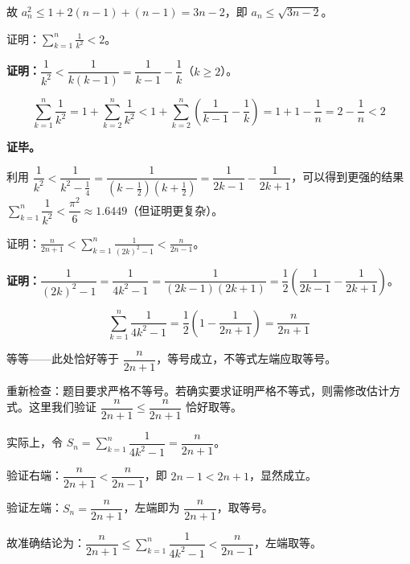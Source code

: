 \documentclass[12pt, a4paper]{ctexart}
\begin{document}
故 $a_n^2 \leq 1 + 2(n-1) + (n-1) = 3n - 2$，即 $a_n \leq \sqrt{3n-2}$。\;\checkmark

\begin{examplebox}[【例题7】裂项求和与放缩]
证明：$\displaystyle\sum_{k=1}^{n} \frac{1}{k^2} < 2$。
\end{examplebox}

\textbf{证明：}$\dfrac{1}{k^2} < \dfrac{1}{k(k-1)} = \dfrac{1}{k-1} - \dfrac{1}{k}$（$k \geq 2$）。

\[
\sum_{k=1}^{n}\frac{1}{k^2} = 1 + \sum_{k=2}^{n}\frac{1}{k^2} < 1 + \sum_{k=2}^{n}\left(\frac{1}{k-1} - \frac{1}{k}\right) = 1 + 1 - \frac{1}{n} = 2 - \frac{1}{n} < 2
\]

\textbf{证毕。}

\begin{tipbox}[更强的上界]
利用 $\dfrac{1}{k^2} < \dfrac{1}{k^2 - \frac{1}{4}} = \dfrac{1}{(k-\frac{1}{2})(k+\frac{1}{2})} = \dfrac{1}{2k-1} - \dfrac{1}{2k+1}$，可以得到更强的结果 $\displaystyle\sum_{k=1}^{n}\dfrac{1}{k^2} < \dfrac{\pi^2}{6} \approx 1.6449$（但证明更复杂）。
\end{tipbox}

\begin{examplebox}[【例题8】裂项放缩求和的精确估计]
证明：$\displaystyle\frac{n}{2n+1} < \sum_{k=1}^{n}\frac{1}{(2k)^2 - 1} < \frac{n}{2n-1}$。
\end{examplebox}

\textbf{证明：}$\dfrac{1}{(2k)^2 - 1} = \dfrac{1}{4k^2 - 1} = \dfrac{1}{(2k-1)(2k+1)} = \dfrac{1}{2}\left(\dfrac{1}{2k-1} - \dfrac{1}{2k+1}\right)$。

\[
\sum_{k=1}^{n}\frac{1}{4k^2-1} = \frac{1}{2}\left(1 - \frac{1}{2n+1}\right) = \frac{n}{2n+1}
\]

等等——此处恰好等于 $\dfrac{n}{2n+1}$，等号成立，不等式左端应取等号。

重新检查：题目要求严格不等号。若确实要求证明严格不等式，则需修改估计方式。这里我们验证 $\dfrac{n}{2n+1} \leq \dfrac{n}{2n+1}$ 恰好取等。

实际上，令 $S_n = \displaystyle\sum_{k=1}^{n}\dfrac{1}{4k^2-1} = \dfrac{n}{2n+1}$。

验证右端：$\dfrac{n}{2n+1} < \dfrac{n}{2n-1}$，即 $2n-1 < 2n+1$，显然成立。

验证左端：$S_n = \dfrac{n}{2n+1}$，左端即为 $\dfrac{n}{2n+1}$，取等号。

故准确结论为：$\dfrac{n}{2n+1} \leq \displaystyle\sum_{k=1}^{n}\dfrac{1}{4k^2-1} < \dfrac{n}{2n-1}$，左端取等。
\end{document}
